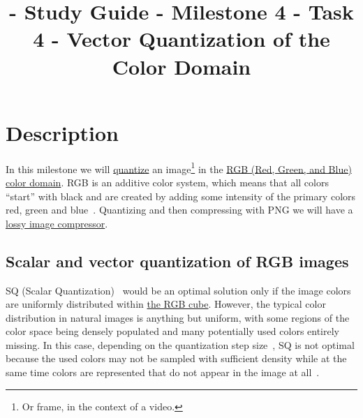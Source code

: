 

\title{\SM{} - Study Guide - Milestone 4 - Task 4 - Vector Quantization of the Color Domain}

\maketitle

\tableofcontents

\section{Description}

In this milestone we will
\href{https://vicente-gonzalez-ruiz.github.io/quantization/}{quantize}
an image\footnote{Or frame, in the context of a video.} in the
\href{https://en.wikipedia.org/wiki/RGB_color_model}{RGB (Red, Green,
  and Blue) color domain}. RGB is an additive color system, which
means that all colors ``start'' with black and are created by adding
some intensity of the primary colors red, green and
blue~\cite{burger2016digital}. Quantizing and then compressing with
PNG we will have a
\href{https://en.wikipedia.org/wiki/Lossy_compression}{lossy image
  compressor}.


\subsection{Scalar and vector quantization of RGB images}

SQ (Scalar Quantization)~\cite{vruiz__scalar_quantization} would be an
optimal solution only if the image colors are uniformly distributed
within \href{https://en.wikipedia.org/wiki/RGB_color_model}{the RGB
  cube}. However, the typical color distribution in natural images is
anything but uniform, with some regions of the color space being
densely populated and many potentially used colors entirely
missing. In this case, depending on the quantization step
size~\cite{vruiz__signal_quantization}, SQ is not optimal because the
used colors may not be sampled with suﬃcient density while at the same
time colors are represented that do not appear in the image at
all~\cite{burger2016digital}.

